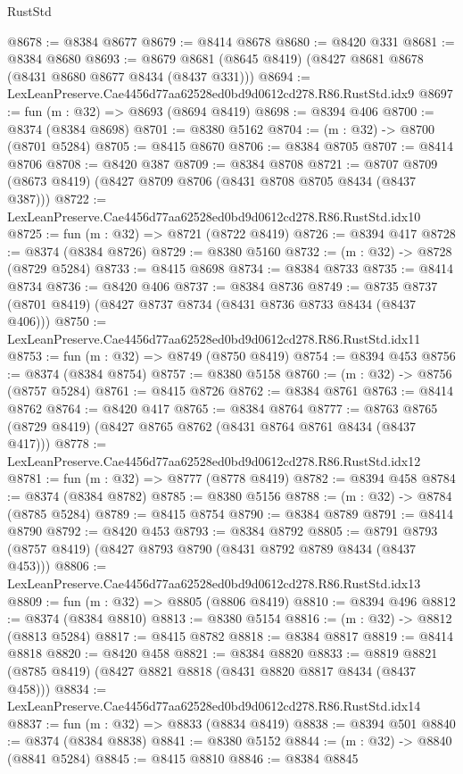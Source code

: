 \begin{lexlean}{RustStd}
\begin{coremodule}
@8678 := @8384 @8677
@8679 := @8414 @8678
@8680 := @8420 @331
@8681 := @8384 @8680
@8693 := @8679 @8681 (@8645 @8419) (@8427 @8681 @8678 (@8431 @8680 @8677 @8434 (@8437 @331)))
@8694 := LexLeanPreserve.Cae4456d77aa62528ed0bd9d0612cd278.R86.RustStd.idx9
@8697 := fun (m : @32) => @8693 (@8694 @8419)
@8698 := @8394 @406
@8700 := @8374 (@8384 @8698)
@8701 := @8380 @5162
@8704 := (m : @32) -> @8700 (@8701 @5284)
@8705 := @8415 @8670
@8706 := @8384 @8705
@8707 := @8414 @8706
@8708 := @8420 @387
@8709 := @8384 @8708
@8721 := @8707 @8709 (@8673 @8419) (@8427 @8709 @8706 (@8431 @8708 @8705 @8434 (@8437 @387)))
@8722 := LexLeanPreserve.Cae4456d77aa62528ed0bd9d0612cd278.R86.RustStd.idx10
@8725 := fun (m : @32) => @8721 (@8722 @8419)
@8726 := @8394 @417
@8728 := @8374 (@8384 @8726)
@8729 := @8380 @5160
@8732 := (m : @32) -> @8728 (@8729 @5284)
@8733 := @8415 @8698
@8734 := @8384 @8733
@8735 := @8414 @8734
@8736 := @8420 @406
@8737 := @8384 @8736
@8749 := @8735 @8737 (@8701 @8419) (@8427 @8737 @8734 (@8431 @8736 @8733 @8434 (@8437 @406)))
@8750 := LexLeanPreserve.Cae4456d77aa62528ed0bd9d0612cd278.R86.RustStd.idx11
@8753 := fun (m : @32) => @8749 (@8750 @8419)
@8754 := @8394 @453
@8756 := @8374 (@8384 @8754)
@8757 := @8380 @5158
@8760 := (m : @32) -> @8756 (@8757 @5284)
@8761 := @8415 @8726
@8762 := @8384 @8761
@8763 := @8414 @8762
@8764 := @8420 @417
@8765 := @8384 @8764
@8777 := @8763 @8765 (@8729 @8419) (@8427 @8765 @8762 (@8431 @8764 @8761 @8434 (@8437 @417)))
@8778 := LexLeanPreserve.Cae4456d77aa62528ed0bd9d0612cd278.R86.RustStd.idx12
@8781 := fun (m : @32) => @8777 (@8778 @8419)
@8782 := @8394 @458
@8784 := @8374 (@8384 @8782)
@8785 := @8380 @5156
@8788 := (m : @32) -> @8784 (@8785 @5284)
@8789 := @8415 @8754
@8790 := @8384 @8789
@8791 := @8414 @8790
@8792 := @8420 @453
@8793 := @8384 @8792
@8805 := @8791 @8793 (@8757 @8419) (@8427 @8793 @8790 (@8431 @8792 @8789 @8434 (@8437 @453)))
@8806 := LexLeanPreserve.Cae4456d77aa62528ed0bd9d0612cd278.R86.RustStd.idx13
@8809 := fun (m : @32) => @8805 (@8806 @8419)
@8810 := @8394 @496
@8812 := @8374 (@8384 @8810)
@8813 := @8380 @5154
@8816 := (m : @32) -> @8812 (@8813 @5284)
@8817 := @8415 @8782
@8818 := @8384 @8817
@8819 := @8414 @8818
@8820 := @8420 @458
@8821 := @8384 @8820
@8833 := @8819 @8821 (@8785 @8419) (@8427 @8821 @8818 (@8431 @8820 @8817 @8434 (@8437 @458)))
@8834 := LexLeanPreserve.Cae4456d77aa62528ed0bd9d0612cd278.R86.RustStd.idx14
@8837 := fun (m : @32) => @8833 (@8834 @8419)
@8838 := @8394 @501
@8840 := @8374 (@8384 @8838)
@8841 := @8380 @5152
@8844 := (m : @32) -> @8840 (@8841 @5284)
@8845 := @8415 @8810
@8846 := @8384 @8845

\end{coremodule}
\end{lexlean}
